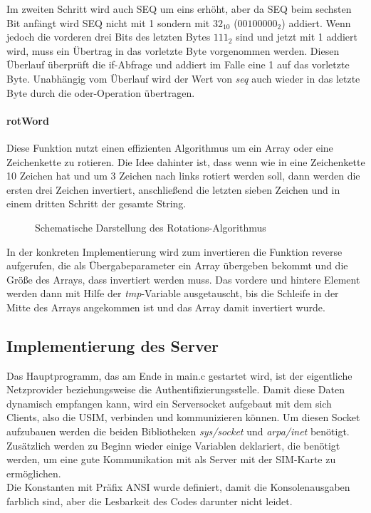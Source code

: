 		Im zweiten Schritt wird auch SEQ um eins erhöht, aber da SEQ beim sechsten Bit anfängt wird SEQ nicht mit
		1 sondern mit $32_{10}$ ($00100000_2$) addiert. Wenn jedoch die vorderen drei Bits des letzten Bytes $111_2$ sind
		und jetzt mit 1 addiert wird, muss ein Übertrag in das vorletzte Byte vorgenommen werden. Diesen Überlauf
		überprüft die if-Abfrage und addiert im Falle eine 1 auf das vorletzte Byte. Unabhängig vom Überlauf wird
		der Wert von \emph{seq} auch wieder in das letzte Byte durch die oder-Operation übertragen.

		\paragraph{rotWord}
		Diese Funktion nutzt einen effizienten Algorithmus um ein Array oder eine Zeichenkette zu rotieren. Die
		Idee dahinter ist, dass	wenn wie in  eine Zeichenkette 10 Zeichen hat und um 3 Zeichen
		nach links rotiert werden soll, dann werden die ersten drei Zeichen invertiert, anschließend die letzten
		sieben Zeichen und in einem dritten Schritt der gesamte String.
		\begin{figure}[htp]
			\begin{center}
			\end{center}
			\caption{Schematische Darstellung des Rotations-Algorithmus}
			\label{fig:rotWord}
		\end{figure}
		
		In der konkreten Implementierung wird zum invertieren die Funktion reverse aufgerufen, die als
		Übergabeparameter ein Array übergeben bekommt und die Größe des Arrays, dass invertiert werden muss.
		Das vordere und hintere Element werden dann mit Hilfe der \emph{tmp}-Variable ausgetauscht, bis die Schleife
		in der Mitte des Arrays angekommen ist und das Array damit invertiert wurde.
		
	\subsection{Implementierung des Server}
    \label{subsec:impl_server}
	Das Hauptprogramm, das am Ende in main.c gestartet wird, ist der eigentliche Netzprovider beziehungsweise
	die Authentifizierungsstelle. Damit diese Daten dynamisch empfangen kann, wird ein Serversocket aufgebaut
	mit dem sich Clients, also die USIM, verbinden und kommunizieren können. Um diesen Socket aufzubauen werden
	die beiden Bibliotheken \emph{sys/socket} und \emph{arpa/inet} benötigt. Zusätzlich werden zu Beginn wieder
	einige Variablen deklariert, die benötigt werden, um eine gute Kommunikation mit als Server mit der SIM-Karte
	zu ermöglichen. \\
	Die Konstanten mit Präfix ANSI wurde definiert, damit die Konsolenausgaben farblich sind, aber die Lesbarkeit des
	Codes darunter nicht leidet.
	

